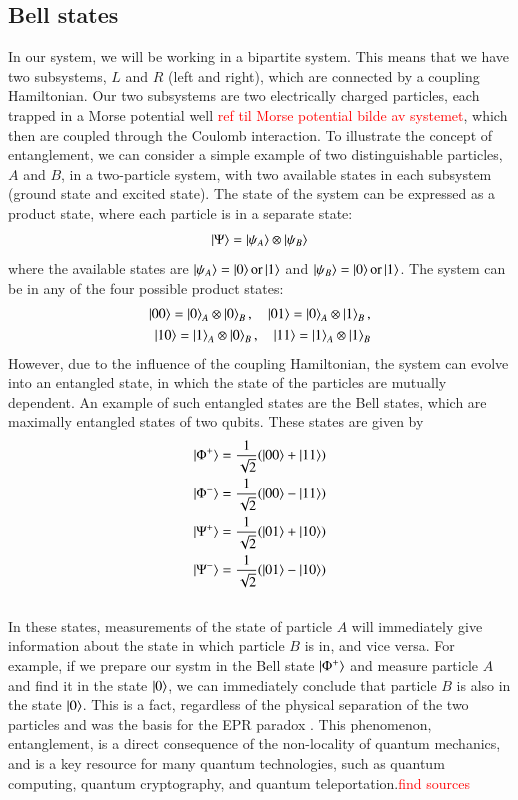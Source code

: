 \documentclass{subfiles}
\begin{document}
\subsection*{Bell states}
In our system, we will be working in a bipartite system. This means that we have two subsystems, $L$ and $R$ (left and right), which are connected by a coupling Hamiltonian. Our two subsystems are two electrically charged particles, each trapped in a Morse potential well \textcolor{red}{ref til Morse potential bilde av systemet}, which then are coupled through the Coulomb interaction. 
To illustrate the concept of entanglement, we can consider a simple example of two distinguishable particles, $A$ and $B$, in a two-particle system, with two available states in each subsystem (ground state and excited state). The state of the system can be expressed as a product state, where each particle is in a separate state:
\begin{align*}
    \ket{\Psi} = \ket{\psi_A}\otimes\ket{\psi_B}
\end{align*}
where the available states are $\ket{\psi_A} = \ket{0} \text{or} \ket{1}$ and $\ket{\psi_B} = \ket{0} \text{or} \ket{1}$. The system can be in any of the four possible product states: 
\begin{align*}
    \ket{00} = \ket{0}_A\otimes\ket{0}_B, \quad \ket{01} = \ket{0}_A\otimes\ket{1}_B, \\
    \ket{10} = \ket{1}_A\otimes\ket{0}_B, \quad \ket{11} = \ket{1}_A\otimes\ket{1}_B
\end{align*}
However, due to the influence of the coupling Hamiltonian, the system can evolve into an entangled state, in which the state of the particles are mutually dependent. An example of such entangled states are the Bell states, which are maximally entangled states of two qubits. These states are given by
\begin{align*}
    \ket{\Phi^+} &= \frac{1}{\sqrt{2}}(\ket{00} + \ket{11}) \\
    \ket{\Phi^-} &= \frac{1}{\sqrt{2}}(\ket{00} - \ket{11}) \\
    \ket{\Psi^+} &= \frac{1}{\sqrt{2}}(\ket{01} + \ket{10}) \\
    \ket{\Psi^-} &= \frac{1}{\sqrt{2}}(\ket{01} - \ket{10})
\end{align*}
\\ 
In these states, measurements of the state of particle $A$ will immediately give information about the state in which particle $B$ is in, and vice versa. For example, if we prepare our systm in the Bell state $\ket{\Phi^+}$ and measure particle $A$ and find it in the state $\ket{0}$, we can immediately conclude that particle $B$ is also in the state $\ket{0}$. This is a fact, regardless of the physical separation of the two particles and was the basis for the EPR paradox \cite{EPR_1935}. This phenomenon, entanglement, is a direct consequence of the non-locality of quantum mechanics, and is a key resource for many quantum technologies, such as quantum computing, quantum cryptography, and quantum teleportation.\textcolor{red}{find sources}\\ 
\end{document}

